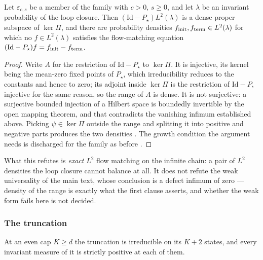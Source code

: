 \begin{theorem}
  \label{thm:main_unsolvable}
  \leanok
Let $\varepsilon_{c,s}$ be a member of the family with $c>0$, $s\geq0$, and let $\lambda$ be an
invariant probability of the loop closure. Then $(\mathrm{Id}-P_\star)L^2(\lambda)$ is a dense
proper subspace of $\ker\Pi$, and there are probability densities
$f_{\mathrm{init}},f_{\mathrm{term}}\in L^2(\lambda)$ for which no $f\in L^2(\lambda)$ satisfies the flow-matching
equation $(\mathrm{Id}-P_\star)f=f_{\mathrm{init}}-f_{\mathrm{term}}$.
\end{theorem}

\begin{proof}
  \leanok
Write $A$ for the restriction of $\mathrm{Id}-P_\star$ to $\ker\Pi$. It is injective, its
kernel being the mean-zero fixed points of $P_\star$, which irreducibility reduces to the
constants and hence to zero; its adjoint inside $\ker\Pi$ is the restriction of
$\mathrm{Id}-P$, injective for the same reason, so the range of $A$ is dense. It is not
surjective: a surjective bounded injection of a Hilbert space is boundedly invertible by the
open mapping theorem, and that contradicts the vanishing infimum established above. Picking
$\psi\in\ker\Pi$ outside the range and splitting it into positive and negative parts produces
the two densities . The growth condition the argument
needs is discharged for the family as before
.
\end{proof}

\noindent What this refutes is \emph{exact} $L^2$ flow matching on the infinite chain: a pair of $L^2$
densities the loop closure cannot balance at all. It does not refute the weak universality of
the main text, whose conclusion is a defect infimum of zero --- density of the range is exactly
what the first clause asserts, and whether the weak form fails here is not decided.


\subsubsection{The truncation}


\begin{theorem}
  \label{thm:main_truncation_irreducible}
  \leanok
At an even cap $K\geq d$ the truncation is irreducible on its $K+2$ states, and every invariant
measure of it is strictly positive at each of them.
\end{theorem}

